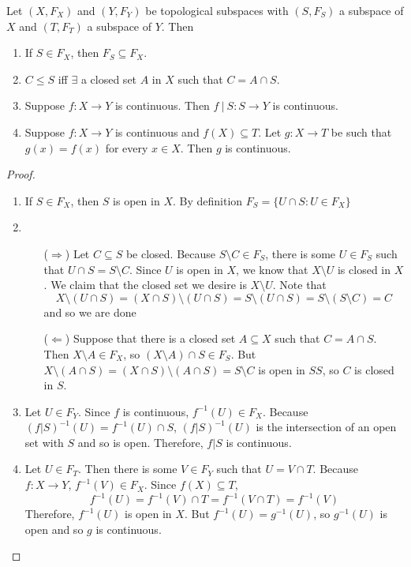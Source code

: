 Let $(X, F_X)$ and $(Y, F_Y)$ be topological subspaces with $(S, F_S)$ a subspace of $X$ and $(T, F_T)$ a subspace of $Y$. Then 
\begin{enumerate}
	\item If $S\in F_X$, then $F_S \subseteq F_X$. 
	\item $C\le S$ iff $\exists$ a closed set $A$ in $X$ such that $C = A\cap S$. 
	\item Suppose $f:X\to Y$ is continuous. Then $f\ |\ S : S \to Y$ is continuous. 
	\item Suppose $f:X\to Y$ is continuous and $f(X) \subseteq T$. Let $g:X\to T$ be such that $g(x) = f(x) $ for every $x\in X$. Then $g$ is continuous. 
\end{enumerate}
\begin{proof}
	\begin{enumerate}
		\item If $S \in F_X$, then $S$ is open in $X$. By definition $F_S = \{ U\cap S : U\in F_X\}$ 
		\item 
		\begin{itemize}
			\item [($\Rightarrow$)] Let $C\subseteq S$ be closed. Because $S\setminus C \in F_S$, there is some $U\in F_S$ such that $U\cap S = S\setminus C$. Since $U$ is open in $X$, we know that $X\setminus U$ is closed in $X$. We claim that the closed set we desire is $X\setminus U$. Note that
			\[ X\setminus (U\cap S) = (X\cap S)\setminus (U\cap S) = S\setminus (U\cap S) = S\setminus (S\setminus C) = C\]
			and so we are done 
			\item [($\Leftarrow$)] Suppose that there is a closed set $A\subseteq X$ such that $C = A\cap S$. Then $X\setminus A \in F_X$, so $(X\setminus A)\cap S \in F_S$. But $X\setminus (A\cap S) = (X\cap S)\setminus (A\cap S) = S\setminus C$ is open in $SS$, so $C$ is closed in $S$. 
		\end{itemize}
		\item Let $U\in F_Y$. Since $f$ is continuous, $f^{-1}(U)\in F_X$. Because $(f|S)^{-1}(U) = f^{-1}(U)\cap S$, $(f|S)^{-1}(U)$ is the intersection of an open set with $S$ and so is open. Therefore, $f|S$ is continuous. 
		\item Let $U\in F_T$. Then there is some $V\in F_Y$ such that $U = V\cap T$. Because $f:X\to Y$, $f^{-1}(V)\in F_X$. Since $f(X)\subseteq T$,
		\[ f^{-1}(U) = f^{-1}(V)\cap T = f^{-1}(V\cap T) = f^{-1}(V) \]
		Therefore, $f^{-1}(U)$ is open in $X$. But $f^{-1}(U) = g^{-1}(U)$, so $g^{-1}(U)$ is open and so $g$ is continuous. 
	\end{enumerate}
\end{proof}

